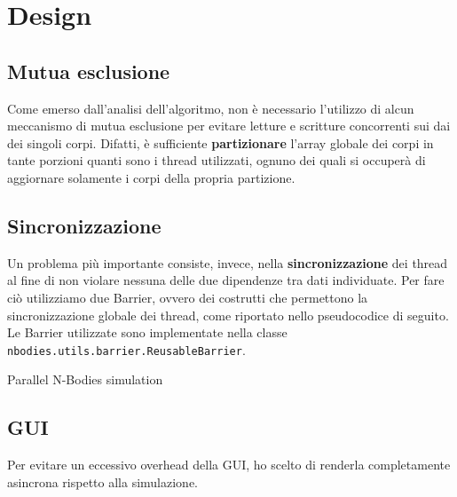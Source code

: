 \documentclass[12pt,a4paper,oneside]{article}
\begin{document}
	\section{Design}
	\subsection{Mutua esclusione}
	Come emerso dall'analisi dell'algoritmo, non è necessario l'utilizzo di alcun meccanismo di mutua esclusione per evitare letture e scritture concorrenti sui dai dei singoli corpi. Difatti, è sufficiente \textbf{partizionare} l'array globale dei corpi in tante porzioni quanti sono i thread utilizzati, ognuno dei quali si occuperà di aggiornare solamente i corpi della propria partizione.
	
	\subsection{Sincronizzazione}
	Un problema più importante consiste, invece, nella \textbf{sincronizzazione} dei thread al fine di non violare nessuna delle due dipendenze tra dati individuate. Per fare ciò utilizziamo due Barrier, ovvero dei costrutti che permettono la sincronizzazione globale dei thread, come riportato nello pseudocodice di seguito. Le Barrier utilizzate sono implementate nella classe \texttt{nbodies.utils.barrier.ReusableBarrier}.
	
	\begin{algorithm}
		
		\caption{Parallel N-Bodies simulation}
		\label{alg:sim-barrier}
	\end{algorithm}

	\subsection{GUI}
	Per evitare un eccessivo overhead della GUI, ho scelto di renderla completamente asincrona rispetto alla simulazione.
	
\end{document}
